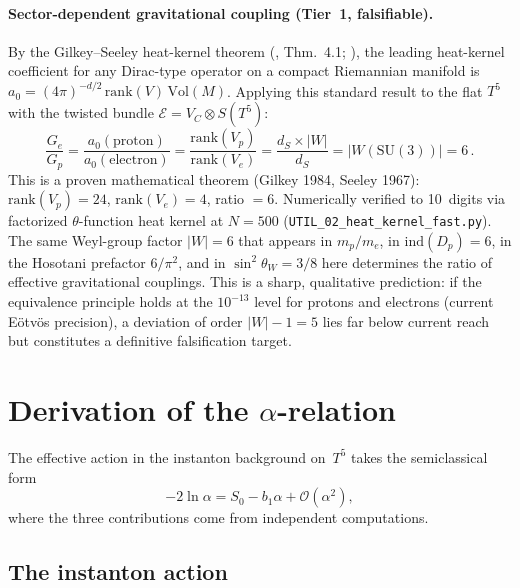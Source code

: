 \documentclass[11pt,a4paper]{article}
\theoremstyle{definition}
\theoremstyle{remark}
\begin{document}
\paragraph{Sector-dependent gravitational coupling (Tier~1, falsifiable).}
By the Gilkey--Seeley heat-kernel theorem
(\cite{Gilkey1984}, Thm.~4.1; \cite{Seeley1967}), the leading
heat-kernel coefficient for any Dirac-type operator on a compact
Riemannian manifold is
$a_0=(4\pi)^{-d/2}\,\mathrm{rank}(V)\,\mathrm{Vol}(M)$.
Applying this standard result to the flat $T^5$
with the twisted bundle $\mathcal{E}=V_C\otimes S(T^5)$:
\begin{equation}\label{eq:Gratio}
  \frac{G_e}{G_p}
  = \frac{a_0(\text{proton})}{a_0(\text{electron})}
  = \frac{\mathrm{rank}(V_p)}{\mathrm{rank}(V_e)}
  = \frac{d_S\times|W|}{d_S}
  = |W(\mathrm{SU}(3))| = 6\,.
\end{equation}
This is a proven mathematical theorem (Gilkey 1984, Seeley 1967):
$\mathrm{rank}(V_p)=24$, $\mathrm{rank}(V_e)=4$, ratio $=6$.
Numerically verified to 10~digits via factorized $\theta$-function
heat kernel at $N\!=\!500$ (\texttt{UTIL\_02\_heat\_kernel\_fast.py}).
The same Weyl-group factor $|W|=6$ that appears in $m_p/m_e$,
in $\mathrm{ind}(D_p)=6$, in the Hosotani prefactor $6/\pi^2$,
and in $\sin^2\theta_W=3/8$ here determines the ratio of effective
gravitational couplings.
This is a sharp, qualitative prediction: if the equivalence principle
holds at the $10^{-13}$ level for protons and electrons (current
E\"{o}tv\"{o}s precision), a deviation of order $|W|-1 = 5$ lies
far below current reach but constitutes a definitive falsification
target.

\section{Derivation of the \texorpdfstring{$\alpha$}{alpha}-relation}
\label{sec:V3}

The effective action in the instanton background on~$T^5$ takes the
semiclassical form
\begin{equation}\label{eq:structure}
  -2\ln\alpha = S_0 - b_1\alpha + \mathcal{O}(\alpha^2),
\end{equation}
where the three contributions come from independent computations.

\subsection{The instanton action}
\end{document}
